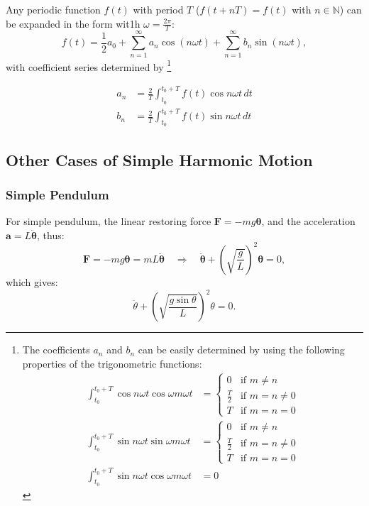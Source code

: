 \documentclass[openany]{book}
\begin{document}
Any periodic function $f(t)$ with period $T$ ($f(t+nT)=f(t)$ with $n\in \mathbb{N}$) can be expanded in the form wit1h $\omega =\frac{2\pi}{T}$:
\begin{equation}\label{eq:3}
f(t)=\frac{1}{2}a_0+\sum _{n=1}^{\infty}a_n \cos (n\omega t)+\sum _{n=1}^{\infty}b_n \sin (n\omega t),
\end{equation}
with coefficient series determined by \footnote{The coefficients $a_n$ and $b_n$ can be easily determined by
using the following properties of the trigonometric functions:
\begin{align*}
\int _{t_0}^{t_0+T}\cos n\omega t\cos \omega m\omega t&=\begin{cases}
0&\text{if } m\neq n\\
\frac{T}{2}&\text{if }m=n\neq 0\\
T&\text{if }m=n=0
\end{cases}\\
\int _{t_0}^{t_0+T}\sin n\omega t\sin \omega m\omega t&=\begin{cases}
0&\text{if } m\neq n\\
\frac{T}{2}&\text{if }m=n\neq 0\\
T&\text{if }m=n=0
\end{cases}\\
\int _{t_0}^{t_0+T}\sin n\omega t\cos \omega m\omega t&=0
\end{align*}
}

\begin{align*}
a_n&=\frac{2}{T}\int _{t_0}^{t_0+T}f(t)\cos n\omega t\,dt\\
b_n&=\frac{2}{T}\int _{t_0}^{t_0+T}f(t)\sin n\omega t\,dt
\end{align*}
\subsection{Other Cases of Simple Harmonic Motion}
\subsubsection{Simple Pendulum}
For simple pendulum, the linear restoring force $\mathbf{F}= - mg \bm \theta $, and the acceleration $\mathbf{a}=L \ddot{\bm\theta}$, thus:
\[\mathbf{F}=-mg \bm{\theta }=mL \ddot{\bm\theta}\quad \Rightarrow \quad\ddot{\bm{\theta}}+\left(\sqrt{\frac{g}{L}}\right)^2\bm{\theta}=0,\]
which gives:
\[\ddot{\theta }+\left(\sqrt{\frac{g\sin \theta }{L}}\right)^2\theta =0.\]
\end{document}
